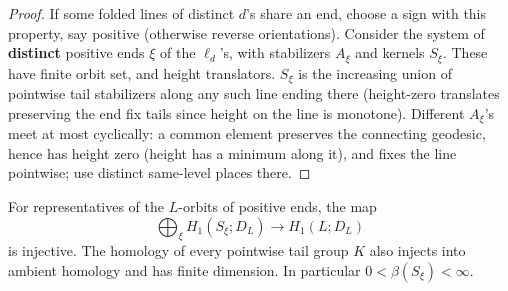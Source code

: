 \begin{proof}
If some folded lines of distinct \(d\)'s share an end, choose a sign with this property, say positive (otherwise reverse orientations). Consider the system of \textbf{distinct} positive ends \(\xi\) of the \(\ell_d\)'s, with stabilizers \(A_\xi\) and kernels \(S_\xi\). These have finite orbit set, and height translators. \(S_\xi\) is the increasing union of pointwise tail stabilizers along any such line ending there (height-zero translates preserving the end fix tails since height on the line is monotone). Different \(A_\xi\)'s meet at most cyclically: a common element preserves the connecting geodesic, hence has height zero (height has a minimum along it), and fixes the line pointwise; use distinct same-level places there.
\end{proof}

\begin{lemma}\label{close:tail-injection}
For representatives of the $L$-orbits of positive ends, the map
\[
 \bigoplus_\xi H_1(S_\xi;D_L)\longrightarrow H_1(L;D_L)
\]
is injective. The homology of every pointwise tail group $K$ also
injects into ambient homology and has finite dimension. In particular
$0<\beta(S_\xi)<\infty$.
\end{lemma}

